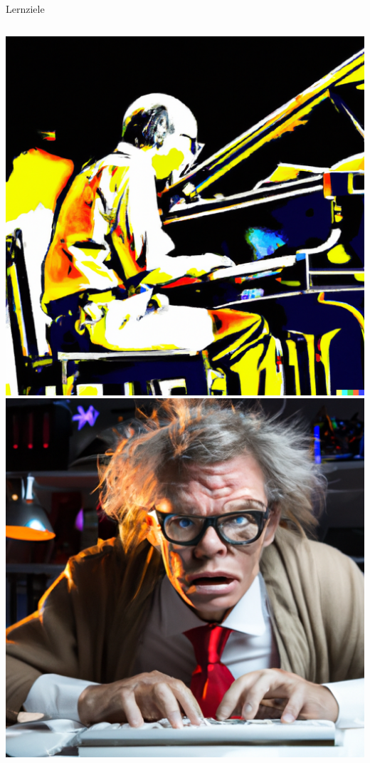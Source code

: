 {\begin{frame}{Lernziele}
\begin{columns}
        \begin{column}{.3\textwidth}
            \includegraphics[width=\textwidth]{img/lernziele1}
            \includegraphics[width=\textwidth]{img/lernziele2}
        \end{column}
    \end{columns}
\end{frame}
}

